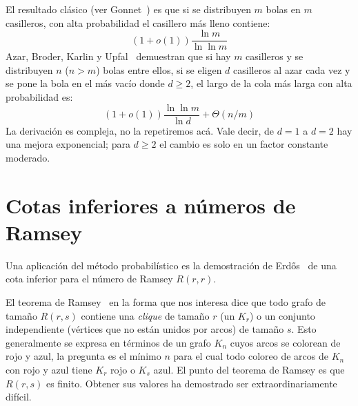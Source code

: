   El resultado clásico
  (ver Gonnet~\cite{gonnet81:_expected_len_longest_probe_seq})
  es que si se distribuyen \(m\) bolas
  en \(m\) casilleros,
  con alta probabilidad el casillero más lleno contiene:
  \begin{equation*}
    (1 + o(1)) \frac{\ln m}{\ln \ln m}
  \end{equation*}
  Azar, Broder, Karlin y Upfal~%
    \cite{azar00:_balanced_alloc}
  demuestran que si hay \(m\) casilleros
  y se distribuyen \(n\)
  (\(n > m\))
  bolas entre ellos,
  si se eligen \(d\) casilleros al azar cada vez
  y se pone la bola en el más vacío
  donde \(d \ge 2\),
  el largo de la cola más larga con alta probabilidad es:
  \begin{equation*}
    (1 + o(1)) \frac{\ln \ln m}{\ln d} + \Theta(n/m)
  \end{equation*}
  La derivación es compleja,
  no la repetiremos acá.
  Vale decir,
  de \(d = 1\) a \(d = 2\) hay una mejora exponencial;
  para \(d \ge 2\) el cambio es solo en un factor constante moderado.

\section{Cotas inferiores a números de Ramsey}
\label{sec:numeros-Ramsey}

  Una aplicación del método probabilístico
  es la demostración de Erdős~%
    \cite{erdos47:_some_remarks_theo_graphs}
  de una cota inferior para el número de Ramsey \(R(r, r)\).

  El teorema de Ramsey~%
    \cite{ramsey30:_probl_formal_logic}
  en la forma que nos interesa dice que todo grafo de tamaño \(R(r, s)\)
  contiene una \emph{\foreignlanguage{english}{clique}} de tamaño \(r\)
  (un \(K_r\))
  o un conjunto independiente
  (vértices que no están unidos por arcos)
  de tamaño \(s\).
  Esto generalmente se expresa en términos de un grafo \(K_n\)
  cuyos arcos se colorean de rojo y azul,
  la pregunta es el mínimo \(n\)
  para el cual todo coloreo de arcos de \(K_n\) con rojo y azul
  tiene \(K_r\) rojo o \(K_s\) azul.
  El punto del teorema de Ramsey es que \(R(r, s)\) es finito.
  Obtener sus valores ha demostrado ser extraordinariamente difícil.

